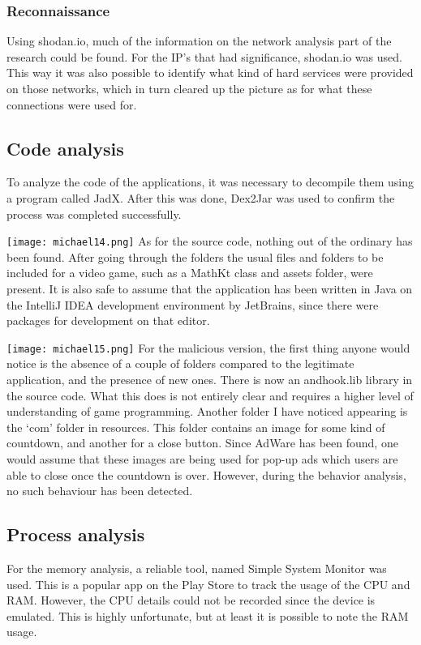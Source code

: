 \subsubsection{Reconnaissance}

Using shodan.io, much of the information on the network analysis part of the research could be found. For the IP’s that had significance, shodan.io was used. This way it was also possible to identify what kind of hard services were provided on those networks, which in turn cleared up the picture as for what these connections were used for.

\newpage
\subsection{Code analysis}
To analyze the code of the applications, it was necessary to decompile them using a program called JadX. After this was done, Dex2Jar was used to confirm the process was completed successfully.

\texttt{[image: michael14.png]}
As for the source code, nothing out of the ordinary has been found. After going through the folders the usual files and folders to be included for a video game, such as a MathKt class and assets folder, were present. It is also safe to assume that the application has been written in Java on the IntelliJ IDEA development environment by JetBrains, since there were packages for development on that editor.

\texttt{[image: michael15.png]}
For the malicious version, the first thing anyone would notice is the absence of a couple of folders compared to the legitimate application, and the presence of new ones. There is now an andhook.lib library in the source code. What this does is not entirely clear and requires a higher level of understanding of game programming. Another folder I have noticed appearing is the ‘com’ folder in resources. This folder contains an image for some kind of countdown, and another for a close button. Since AdWare has been found, one would assume that these images are being used for pop-up ads which users are able to close once the countdown is over. However, during the behavior analysis, no such behaviour has been detected.

\newpage
\subsection{Process analysis}
For the memory analysis, a reliable tool, named Simple System Monitor was used. This is a popular app on the Play Store to track the usage of the CPU and RAM. However, the CPU details could not be recorded since the device is emulated. This is highly unfortunate, but at least it is possible to note the RAM usage.

